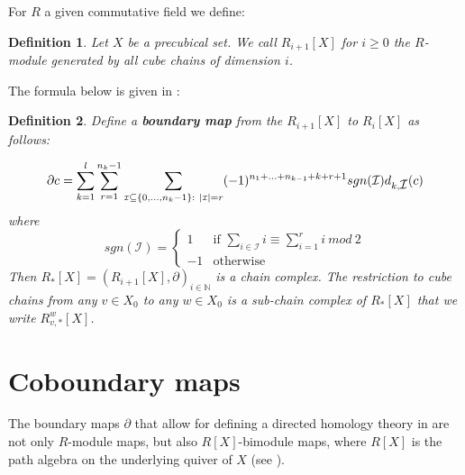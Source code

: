 \documentclass{article}
\newtheorem{definition}{Definition}[section]
\newcommand\look[1]{{\bf #1}}
\newcommand\N[0]{\mathbb{N}}
\begin{document}
For $R$ a given commutative field we define: 

\begin{definition}
\label{def:modcub}
Let $X$ be a precubical set. We call {${R_{i+1}[X]}$} for $i\geq 0$ the $R$-module generated by all cube chains of dimension $i$. %
\end{definition}

The formula below is given in %
\cite{cubechains}: 

\begin{definition}
\label{def:boundaryoperator}
Define a \look{boundary map} from the %
$R_{i+1}[X]$ 
to $R_i[X]$ %
as follows: 

\begin{multline*}
\partial c = \sum\limits_{k=1}^l \sum\limits_{r=1}^{n_k-1} \sum\limits_{\mbox{\tiny $\mathcal{I}$} \subseteq\{0,\ldots,n_k-1\}: \ \mid \mbox{\tiny $\mathcal{I}$} \mid=r}
(-1)^{n_1+\ldots+n_{k-1}+k+r+1} sgn(\mbox{$\mathcal{I}$}) {d_{k,\mbox{$\mathcal{I}$}}(c)}
\end{multline*}
\noindent where
$$
sgn(\mathcal{I})=\left\{\begin{array}{ll}
1 & \mbox{if $\sum\limits_{i\in \mathcal{I}} i \equiv \sum\limits_{i=1}^r i \ mod \ 2$} \\
-1 & \mbox{otherwise}
\end{array}\right.
$$
Then $R_*[X]=(R_{i+1}[X],\partial)_{i\in \N}$ is a chain complex. The restriction to cube chains from any $v \in X_0$ to any $w \in X_0$ is a sub-chain complex of $R_*[X]$ that we write $R^w_{{v},*}[X]$.
\end{definition}

\section{Coboundary maps}
\label{sec:coboundarymaps}

The boundary maps $\partial$ that allow for defining a directed homology theory in \cite{directedpersistencemodule} are not only $R$-module maps, but also $R[X]$-bimodule maps, where $R[X]$ is the path algebra on the underlying quiver of $X$ (see \cite{directedpersistencemodule}). 
\end{document}
